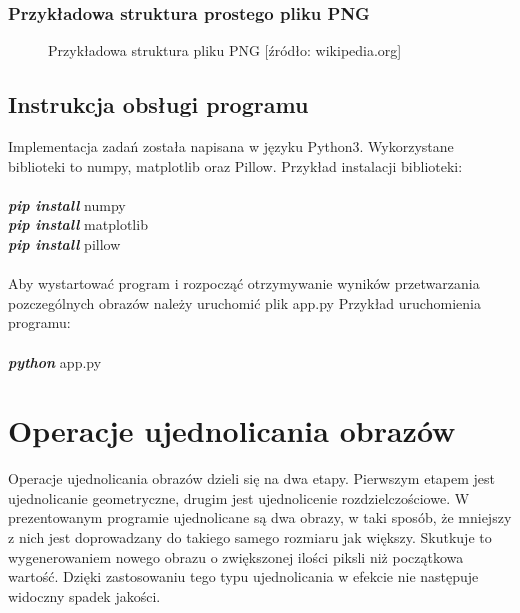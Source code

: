 \documentclass[a4paper,12pt, titlepage]{report}
\begin{document}
\subsection*{Przykładowa struktura prostego pliku PNG}
\begin{figure}[h]
    \centering
    \caption{Przykładowa struktura pliku PNG [źródło: wikipedia.org]}%
    \label{fig:rysunek}%
\end{figure}
\FloatBarrier
\section{Instrukcja obsługi programu}
Implementacja zadań została napisana w języku Python3. Wykorzystane biblioteki to numpy, matplotlib oraz Pillow. Przykład instalacji biblioteki: \\\\ \textbf{\textit{pip install}} numpy\\ \textbf{\textit{pip install}} matplotlib\\ \textbf{\textit{pip install}} pillow\\\\Aby wystartować program i rozpocząć otrzymywanie wyników przetwarzania pozczególnych obrazów należy uruchomić plik app.py Przykład uruchomienia programu: \\\\ \textbf{\textit{python}} app.py

\chapter{Operacje ujednolicania obrazów}
Operacje ujednolicania obrazów dzieli się na dwa etapy. Pierwszym etapem jest ujednolicanie geometryczne, drugim jest ujednolicenie rozdzielczościowe. W prezentowanym programie ujednolicane są dwa obrazy, w taki sposób, że mniejszy z nich jest doprowadzany do takiego samego rozmiaru jak większy. Skutkuje to wygenerowaniem nowego obrazu o zwiększonej ilości piksli niż początkowa wartość. Dzięki zastosowaniu tego typu ujednolicania w efekcie nie następuje widoczny spadek jakości. 
\end{document}
